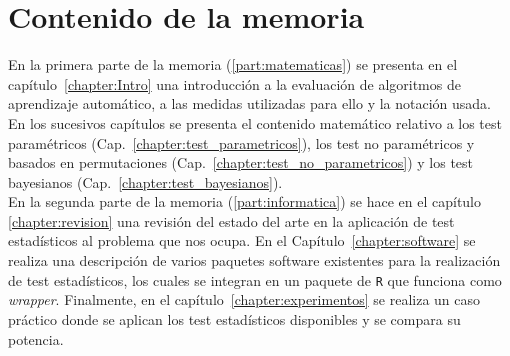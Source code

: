 \section*{Contenido de la memoria}
	En la primera parte de la memoria
(\ref{part:matematicas}) se presenta en el 
capítulo~\ref{chapter:Intro} una introducción a la evaluación 
de algoritmos de aprendizaje automático, a las medidas 
utilizadas para ello y la notación usada. En los 
sucesivos capítulos se presenta el contenido matemático
relativo a los test paramétricos 
(Cap.~\ref{chapter:test_parametricos}), los test no
paramétricos y basados en permutaciones 
(Cap.~\ref{chapter:test_no_parametricos}) y
los test bayesianos (Cap.~\ref{chapter:test_bayesianos}).\\
	En la segunda parte de la memoria 
(\ref{part:informatica}) se hace en el capítulo~
\ref{chapter:revision} una revisión del estado del arte
en la aplicación de test estadísticos al problema que 
nos ocupa. En el Capítulo~\ref{chapter:software} se
realiza una descripción de varios paquetes software 
existentes para la realización de test estadísticos, los
cuales se integran en un paquete de \texttt{R} que funciona
como \textit{wrapper}. Finalmente,
en el capítulo~\ref{chapter:experimentos} se realiza un
caso práctico donde se aplican los test estadísticos
disponibles y se compara su potencia.









	

